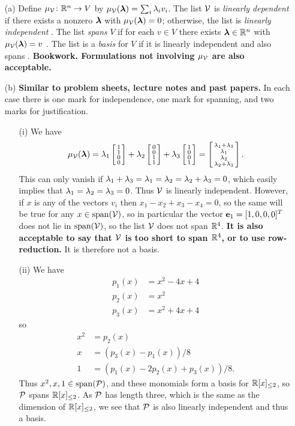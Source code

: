 \documentclass[a4paper]{article}
\begin{document}
\begin{solution}
 \begin{itemize}
  \item[(a)] Define $\mu_{\mathcal{V}}\colon{\mathbb{R}}^n\to V$ by
   $\mu_{\mathcal{V}}(\bm{\lambda})=\sum_i\lambda_iv_i$.  The list $\mathcal{V}$ is \emph{linearly
    dependent} if there exists a nonzero $\bm{\lambda}$ with
   $\mu_{\mathcal{V}}(\bm{\lambda})=0$; otherwise, the list is \emph{linearly
    independent} .  The list \emph{spans} $V$ if for each $v\in V$
   there exists $\bm{\lambda}\in{\mathbb{R}}^n$ with $\mu_{\mathcal{V}}(\bm{\lambda})=v$ .  The list is a
   \emph{basis} for $V$ if it is linearly independent and also spans .
   \textbf{Bookwork.  Formulations not involving $\mu_{\mathcal{V}}$ are also
   acceptable.}
  \item[(b)] 
   \textbf{Similar to problem sheets, lecture notes and past
   papers.}
   In each case there is one mark for independence, one mark for
   spanning, and two marks for justification.
   \begin{itemize}
    \item[(i)] We have 
     \[ \mu_{\mathcal{V}}(\bm{\lambda})=
         \lambda_1\left[\begin{smallmatrix} 1\\1\\0\\0\end{smallmatrix}\right] +
         \lambda_2\left[\begin{smallmatrix} 0\\0\\1\\1\end{smallmatrix}\right] +
         \lambda_3\left[\begin{smallmatrix} 1\\0\\0\\1\end{smallmatrix}\right] = 
         \left[\begin{smallmatrix} \lambda_1+\lambda_3 \\ \lambda_1 \\ \lambda_2 \\ \lambda_2+\lambda_3 \end{smallmatrix}\right].
     \]
     This can only vanish if $\lambda_1+\lambda_3=\lambda_1=\lambda_2=\lambda_2+\lambda_3=0$,
     which easily implies that $\lambda_1=\lambda_2=\lambda_3=0$.  Thus $\mathcal{V}$ is
     linearly independent.  However, if $x$ is any of the vectors
     $v_i$ then $x_1-x_2+x_3-x_4=0$, so the same will be true for any
     $x\in\operatorname{span}(\mathcal{V})$, so in particular the vector $\mathbf{e}_1=[1,0,0,0]^T$
     does not lie in $\operatorname{span}(\mathcal{V})$, so the list $\mathcal{V}$ does not span
     ${\mathbb{R}}^4$.  \textbf{It is also acceptable to say that $\mathcal{V}$ is too
      short to span ${\mathbb{R}}^4$, or to use row-reduction.}  It is therefore
     not a basis.  
    \item[(ii)] We have 
     \begin{align*}
      p_1(x) &= x^2 - 4x + 4 \\
      p_2(x) &= x^2 \\
      p_3(x) &= x^2 + 4x + 4
     \end{align*}
     so 
     \begin{align*}
      x^2 &= p_2(x) \\
      x   &= (p_3(x)-p_1(x))/8 \\
      1   &= (p_1(x)-2p_2(x)+p_3(x))/8. 
     \end{align*}
     Thus $x^2,x,1\in\operatorname{span}(\mathcal{P})$, and these monomials form a basis for
     ${\mathbb{R}}[x]_{\leq 2}$, so $\mathcal{P}$ spans ${\mathbb{R}}[x]_{\leq 2}$.  As $\mathcal{P}$ has
     length three, which is the same as the dimension of
     ${\mathbb{R}}[x]_{\leq 2}$, we see that $\mathcal{P}$ is also linearly independent
     and thus a basis.


\end{itemize}
\end{itemize}
\end{solution}
\end{document}
